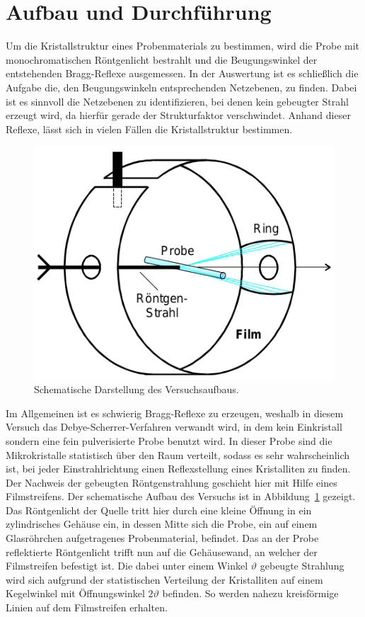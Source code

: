 

\section{Aufbau und Durchführung}

Um die Kristallstruktur eines Probenmaterials zu bestimmen, wird die Probe mit
monochromatischen Röntgenlicht bestrahlt und die Beugungswinkel der
entstehenden Bragg-Reflexe ausgemessen.
In der Auswertung ist es schließlich die Aufgabe die, den Beugungswinkeln
entsprechenden Netzebenen, zu finden. Dabei ist es sinnvoll die Netzebenen zu
identifizieren, bei denen kein gebeugter Strahl erzeugt wird, da hierfür gerade
der Strukturfaktor verschwindet. Anhand dieser Reflexe, lässt sich in vielen
Fällen die Kristallstruktur bestimmen.

\begin{figure}[htpb]
  \centering
  \includegraphics[scale=0.5]{bilder/aufbau.png}
  \caption{Schematische Darstellung des Versuchsaufbaus.}
\label{fig:aufbau}
\end{figure}

Im Allgemeinen ist es schwierig Bragg-Reflexe zu erzeugen, weshalb in diesem
Versuch das Debye-Scherrer-Verfahren verwandt wird, in dem kein Einkristall
sondern eine fein pulverisierte Probe benutzt wird.
In dieser Probe sind die Mikrokristalle statistisch über den Raum verteilt,
sodass es sehr wahrscheinlich ist, bei jeder Einstrahlrichtung einen
Reflexstellung eines Kristalliten zu finden.
Der Nachweis der gebeugten Röntgenstrahlung geschieht hier mit Hilfe eines
Filmstreifens.
Der schematische Aufbau des Versuchs ist in Abbildung~\ref{fig:aufbau} gezeigt.
Das Röntgenlicht der Quelle tritt hier durch eine kleine Öffnung in ein
zylindrisches Gehäuse ein, in dessen Mitte sich die Probe, ein auf einem
Glasröhrchen aufgetragenes Probenmaterial, befindet.
Das an der Probe reflektierte Röntgenlicht trifft nun auf die Gehäusewand, an
welcher der Filmstreifen befestigt ist. Die dabei unter einem Winkel $\vartheta$
gebeugte Strahlung wird sich aufgrund der statistischen Verteilung der
Kristalliten auf einem Kegelwinkel mit Öffnungswinkel $2\vartheta$ befinden.
So werden nahezu kreisförmige Linien auf dem Filmstreifen erhalten.

